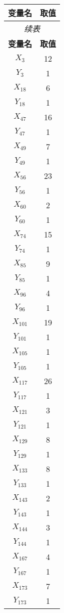 \documentclass[a4paper,10pt]{article}
\begin{document}
\begin{center}
\begin{longtable}{cc}
\toprule
\textbf{变量名} & \textbf{取值} \\
\midrule
\endfirsthead
\multicolumn{2}{c}{\textit{续表}} \\
\toprule
\textbf{变量名} & \textbf{取值} \\
\midrule
\endhead
\bottomrule
\endfoot
\bottomrule
\endlastfoot
$X_{3}$ & 12 \\
$Y_{3}$ & 1 \\
$X_{18}$ & 6 \\
$Y_{18}$ & 1 \\
$X_{47}$ & 16 \\
$Y_{47}$ & 1 \\
$X_{49}$ & 7 \\
$Y_{49}$ & 1 \\
$X_{56}$ & 23 \\
$Y_{56}$ & 1 \\
$X_{60}$ & 2 \\
$Y_{60}$ & 1 \\
$X_{74}$ & 15 \\
$Y_{74}$ & 1 \\
$X_{85}$ & 9 \\
$Y_{85}$ & 1 \\
$X_{96}$ & 4 \\
$Y_{96}$ & 1 \\
$X_{101}$ & 19 \\
$Y_{101}$ & 1 \\
$X_{105}$ & 1 \\
$Y_{105}$ & 1 \\
$X_{117}$ & 26 \\
$Y_{117}$ & 1 \\
$X_{121}$ & 3 \\
$Y_{121}$ & 1 \\
$X_{129}$ & 8 \\
$Y_{129}$ & 1 \\
$X_{133}$ & 8 \\
$Y_{133}$ & 1 \\
$X_{143}$ & 2 \\
$Y_{143}$ & 1 \\
$X_{144}$ & 3 \\
$Y_{144}$ & 1 \\
$X_{167}$ & 4 \\
$Y_{167}$ & 1 \\
$X_{173}$ & 7 \\
$Y_{173}$ & 1 \\

\end{longtable}
\end{center}
\end{document}
